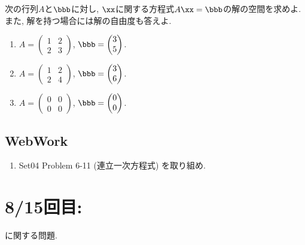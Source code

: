 \begin{quiz}
  次の行列$A$と$\bbb$に対し,
  $\xx$に関する方程式$A\xx=\bbb$の解の空間を求めよ.
  また, 解を持つ場合には解の自由度も答えよ.
  \begin{enumerate}
    \item $A=\begin{pmatrix}1&2\\2&3\end{pmatrix}$,
     $\bbb=\begin{pmatrix}3\\5\end{pmatrix}$.
    \item $A=\begin{pmatrix}1&2\\2&4\end{pmatrix}$,
    $\bbb=\begin{pmatrix}3\\6\end{pmatrix}$.
    \item $A=\begin{pmatrix}0&0\\0&0\end{pmatrix}$,
      $\bbb=\begin{pmatrix}0\\0\end{pmatrix}$.
  \end{enumerate}
\end{quiz}
\subsection{WebWork}
\begin{enumerate}
\item Set04 Problem 6-11 (連立一次方程式) を取り組め.
\end{enumerate}

\newpage
\section{8/15回目: }
に関する問題.
